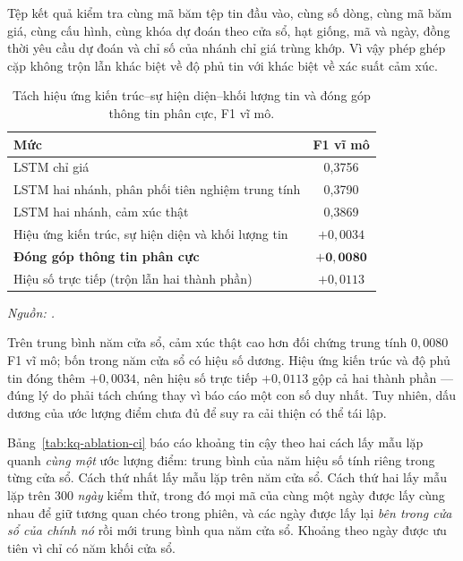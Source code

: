Tệp kết quả kiểm tra cùng mã băm tệp tin đầu vào, cùng số dòng, cùng mã băm giá, cùng cấu
hình, cùng khóa dự đoán theo cửa sổ, hạt giống, mã và ngày, đồng thời yêu cầu dự đoán và
chỉ số của nhánh chỉ giá trùng khớp. Vì vậy phép ghép cặp không trộn lẫn khác biệt về độ
phủ tin với khác biệt về xác suất cảm xúc.

\begin{table}[H]
  \centering
  \caption{Tách hiệu ứng kiến trúc--sự hiện diện--khối lượng tin và đóng góp thông tin phân cực, F1 vĩ mô.}
  \label{tab:kq-ablation}
  \begin{tabular}{p{7.6cm} c}
    \toprule
    Mức & F1 vĩ mô \\
    \midrule
    LSTM chỉ giá & 0,3756 \\
    LSTM hai nhánh, phân phối tiên nghiệm trung tính & 0,3790 \\
    LSTM hai nhánh, cảm xúc thật & 0,3869 \\
    \midrule
    Hiệu ứng kiến trúc, sự hiện diện và khối lượng tin & $+0{,}0034$ \\
    \textbf{Đóng góp thông tin phân cực} & $\mathbf{+0{,}0080}$ \\
    Hiệu số trực tiếp (trộn lẫn hai thành phần) & $+0{,}0113$ \\
    \bottomrule
  \end{tabular}
\noindent\textit{Nguồn: .}
\end{table}

Trên trung bình năm cửa sổ, cảm xúc thật cao hơn đối chứng trung tính $0{,}0080$ F1 vĩ
mô; bốn trong năm cửa sổ có hiệu số dương. Hiệu ứng kiến trúc và độ phủ tin đóng thêm
$+0{,}0034$, nên hiệu số trực tiếp $+0{,}0113$ gộp cả hai thành phần --- đúng lý do phải
tách chúng thay vì báo cáo một con số duy nhất. Tuy nhiên, dấu dương của ước lượng điểm
chưa đủ để suy ra cải thiện có thể tái lập.

Bảng~\ref{tab:kq-ablation-ci} báo cáo khoảng tin cậy theo hai cách lấy mẫu lặp quanh
\textit{cùng một} ước lượng điểm: trung bình của năm hiệu số tính riêng trong từng cửa sổ.
Cách thứ nhất lấy mẫu lặp trên năm cửa sổ. Cách thứ hai lấy mẫu lặp trên 300 \textit{ngày}
kiểm thử, trong đó mọi mã của cùng một ngày được lấy cùng nhau để giữ tương quan chéo
trong phiên, và các ngày được lấy lại \textit{bên trong cửa sổ của chính nó} rồi mới trung
bình qua năm cửa sổ. Khoảng theo ngày được ưu tiên vì chỉ có năm khối cửa sổ.

